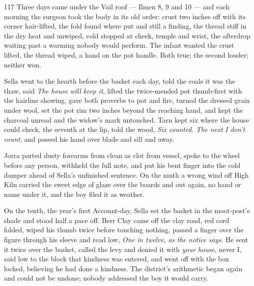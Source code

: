 
\scenebreak


\scenebreak


\scenebreak

\CRtailpiece
\begin{CRchronicle}{117}
Three days came under the Vail roof — Ilmen 8, 9 and 10 — and each morning the surgeon took the body in its old order: crust two inches off with its corner hair-lifted, the fold found where put and still a finding, the thread stiff in the dry heat and unwiped, cold stopped at cheek, temple and wrist, the afterdrop waiting past a warming nobody would perform. The infant wanted the crust lifted, the thread wiped, a hand on the pot handle. Both true; the second louder; neither won.

Sella went to the hearth before the basket each day, told the coals it was the thaw, said \emph{The house will keep it}, lifted the twice-mended pot thumb-first with the hairline showing, gave both proverbs to pot and fire, turned the dressed grain under wool, set the pot rim two inches beyond the reaching hand, and kept the charcoal unread and the widow’s mark untouched. Tarn kept six where the house could check, the seventh at the lip, told the wood, \emph{Six counted. The next I don’t count}, and passed his hand over blade and sill and away.

Jorra parted dusty forearms from clean as clot from vessel, spoke to the wheel before any person, withheld the full note, and put his bent finger into the cold damper ahead of Sella’s unfinished sentence. On the ninth a wrong wind off High Kiln carried the sweet edge of glaze over the boards and out again, no hand or name under it, and the boy filed it as weather.

On the tenth, the year’s first Account-day, Sella set the basket in the moot-post’s shade and stood half a pace off. Berr Clay came off the clay road, red cord folded, wiped his thumb twice before touching nothing, passed a finger over the figure through his sleeve and read low, \emph{One in twelve, as the notice says.} He sent it twice over the basket, called the levy and denied it with \emph{your house}, never I, said low to the block that kindness was entered, and went off with the box locked, believing he had done a kindness. The district’s arithmetic began again and could not be undone; nobody addressed the boy it would carry.


\end{CRchronicle}
